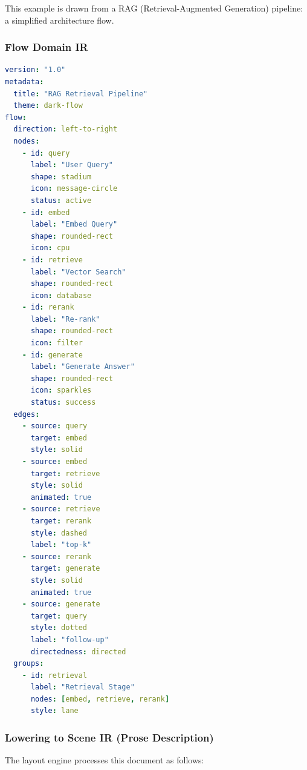 This example is drawn from a RAG (Retrieval-Augmented Generation) pipeline: a simplified architecture flow.

\subsubsection{Flow Domain IR}

\begin{lstlisting}[language=yaml,caption={RAG pipeline --- Flow Domain IR}]
version: "1.0"
metadata:
  title: "RAG Retrieval Pipeline"
  theme: dark-flow
flow:
  direction: left-to-right
  nodes:
    - id: query
      label: "User Query"
      shape: stadium
      icon: message-circle
      status: active
    - id: embed
      label: "Embed Query"
      shape: rounded-rect
      icon: cpu
    - id: retrieve
      label: "Vector Search"
      shape: rounded-rect
      icon: database
    - id: rerank
      label: "Re-rank"
      shape: rounded-rect
      icon: filter
    - id: generate
      label: "Generate Answer"
      shape: rounded-rect
      icon: sparkles
      status: success
  edges:
    - source: query
      target: embed
      style: solid
    - source: embed
      target: retrieve
      style: solid
      animated: true
    - source: retrieve
      target: rerank
      style: dashed
      label: "top-k"
    - source: rerank
      target: generate
      style: solid
      animated: true
    - source: generate
      target: query
      style: dotted
      label: "follow-up"
      directedness: directed
  groups:
    - id: retrieval
      label: "Retrieval Stage"
      nodes: [embed, retrieve, rerank]
      style: lane
\end{lstlisting}

\subsubsection{Lowering to Scene IR (Prose Description)}

The layout engine processes this document as follows:


